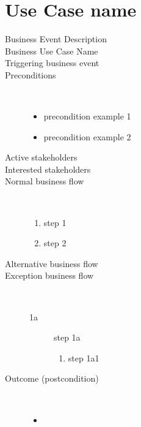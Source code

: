 \section{Use Case name}

\begin{description}
	\item[Business Event Description]
	\item[Business Use Case Name]
	\item[Triggering business event]
	\item[Preconditions] \ %
	\begin{itemize}
		\item precondition example 1
		\item precondition example 2
	\end{itemize}
	\item[Active stakeholders]
	\item[Interested stakeholders] 
	\item[Normal business flow] \ 
	\begin{enumerate}
	  	\item step 1
	  	\item step 2
	\end{enumerate}
	\item[Alternative business flow]
	\item[Exception business flow] \ 
	\begin{description}
		\item[1a] step 1a
		\begin{enumerate}
		  \item step 1a1
		\end{enumerate}
	\end{description}
	\item[Outcome (postcondition)] \ 
	\begin{itemize}
		\item 
	\end{itemize}
\end{description}